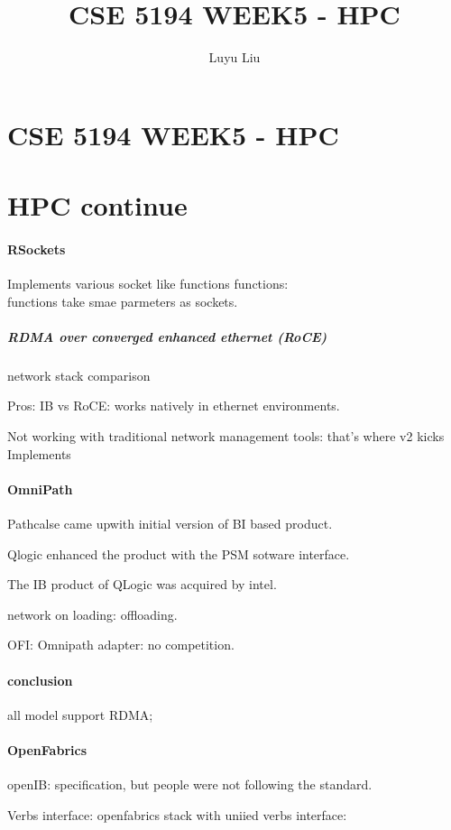 \documentclass[12pt]{article}
\begin{document}
\author{Luyu Liu}

\newcommand\para{\par\refstepcounter{para}\thepara\space}

\section*{CSE 5194 WEEK5 - HPC}
\title{CSE 5194 WEEK5 - HPC}
\section{HPC continue}

\paragraph{RSockets}
Implements various socket like functions functions:
\\ functions take smae parmeters as sockets.

\subparagraph{RDMA over converged enhanced ethernet (RoCE)}
network stack comparison

Pros: IB vs RoCE:
works natively in ethernet environments.

Not working with traditional network management tools: that's where v2 kicks Implements

\paragraph{OmniPath}
Pathcalse came upwith initial version of BI based product.

Qlogic enhanced the product with the PSM sotware interface.

The IB product of QLogic was acquired by intel.

network on loading: offloading.

OFI: Omnipath adapter: no competition.

\paragraph{conclusion}
all model support RDMA;

\paragraph{OpenFabrics}
openIB: specification, but people were not following the standard.

Verbs interface: openfabrics stack with uniied verbs interface:
\end{document}
